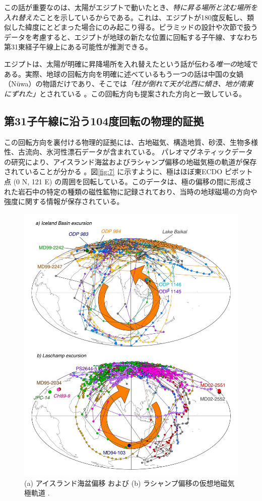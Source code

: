 \documentclass[10pt,twocolumn,letterpaper]{article}
\begin{document}
この話が重要なのは、太陽がエジプトで動いたとき、\textit{特に昇る場所と沈む場所を入れ替えた}ことを示しているからである。これは、エジプトが180度反転し、類似した緯度にとどまった場合にのみ起こり得る。ピラミッドの設計や次節で扱うデータを考慮すると、エジプトが地球の新たな位置に回転する子午線、すなわち第31東経子午線上にある可能性が推測できる。

エジプトは、太陽が明確に昇降場所を入れ替えたという話が伝わる\textit{唯一の}地域である。実際、地球の回転方向を明確に述べているもう一つの話は中国の女媧（Nüwa）の物語だけであり、そこでは\textit{「柱が倒れて天が北西に傾き、地が南東にずれた」}とされている \cite{8}。この回転方向も提案された方向と一致している。

\subsection{第31子午線に沿う104度回転の物理的証拠}

この回転方向を裏付ける物理的証拠には、古地磁気、構造地質、砂漠、生物多様性、古流向、氷河性漂石データが含まれている。
パレオマグネティックデータの研究により、アイスランド海盆およびラシャンプ偏移の地磁気極の軌道が保存されていることが分かる \cite{35}。図\ref{fig:7} に示すように、極はほぼ東ECDO ピボット点 (0 N, 121 E) の周囲を回転している。このデータは、極の偏移の間に形成された岩石中の特定の種類の磁性鉱物に記録されており、当時の地球磁場の方向や強度に関する情報が保存されている。

\begin{figure}[t]
\begin{center}
   \includegraphics[width=0.95\linewidth]{laj.jpg}
\end{center}
   \caption{(a) アイスランド海盆偏移 および (b) ラシャンプ偏移の仮想地磁気極軌道 \cite{35}.}
\label{fig:7}
\label{fig:onecol}
\end{figure}
\end{document}
